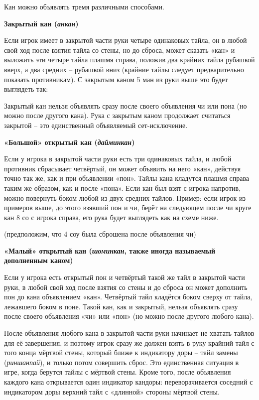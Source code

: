 
Кан можно объявлять тремя различными способами.

\textbf{Закрытый кан (\textit{анкан})}

Если игрок имеет в закрытой части руки четыре одинаковых тайла, он в любой свой ход после взятия тайла со стены, но до сброса, может сказать «кан» и выложить эти четыре тайла плашмя справа, положив два крайних тайла рубашкой вверх, а два средних – рубашкой вниз (крайние тайлы следует предварительно показать противникам). С закрытым каном 5 ман из руки выше это будет выглядеть так:

 \hfill {}

Закрытый кан нельзя объявлять сразу после своего объявления чи или пона (но можно после другого кана). Рука с закрытым каном продолжает считаться закрытой – это единственный объявляемый сет-исключение.

\textbf{«Большой» открытый кан (\textit{дайминкан})}

Если у игрока в закрытой части руки есть три одинаковых тайла, и любой противник сбрасывает четвёртый, он может объявить на него «кан», действуя точно так же, как и при объявлении «пон». Тайлы кана кладутся плашмя справа таким же образом, как и после «пона». Если кан был взят с игрока напротив, можно повернуть боком любой из двух средних тайлов. Пример: если игрок из примеров выше, до этого взявший пон и чи, берёт на следующем после чи круге кан 8 со с игрока справа, его рука будет выглядеть как на схеме ниже.

 \hfill {}

(предположим, что 4 соу была сброшена после объявления чи)

\textbf{«Малый» открытый кан (\textit{шоминкан}, также иногда называемый дополненным каном)}

Если у игрока есть открытый пон и четвёртый такой же тайл в закрытой части руки, в любой свой ход после взятия со стены и до сброса он может дополнить пон до кана объявлением «кан». Четвёртый тайл кладётся боком сверху от тайла, лежавшего боком в поне. Такой кан, как и закрытый, нельзя объявлять сразу после своего объявления «чи» или «пон» (но можно после другого любого кана).


После объявления любого кана в закрытой части руки начинает не хватать тайлов для её завершения, и поэтому игрок сразу же должен взять в руку крайний тайл с того конца мёртвой стены, который ближе к индикатору доры – тайл замены (\textit{риншанпай}), и только потом совершить сброс. Это единственная ситуация в игре, когда берутся тайлы с мёртвой стены. Кроме того, после объявления каждого кана открывается один индикатор кандоры: переворачивается соседний с индикатором доры верхний тайл с «длинной» стороны мёртвой стены.

